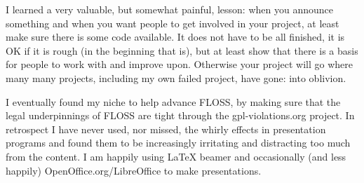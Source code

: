 I learned a very valuable, but somewhat painful, lesson: when you announce
something and when you want people to get involved in your project, at least
make sure there is some code available. It does not have to be all finished, it
is OK if it is rough (in the beginning that is), but at least show that there is
a basis for people to work with and improve upon. Otherwise your project will go
where many many projects, including my own failed project, have gone: into
oblivion.

I eventually found my niche to help advance FLOSS, by making sure that the legal
underpinnings of FLOSS are tight through the gpl-violations.org project. In
retrospect I have never used, nor missed, the whirly effects in presentation
programs and found them to be increasingly irritating and distracting too much
from the content. I am happily using LaTeX beamer and occasionally (and less
happily) OpenOffice.org/LibreOffice to make presentations.
